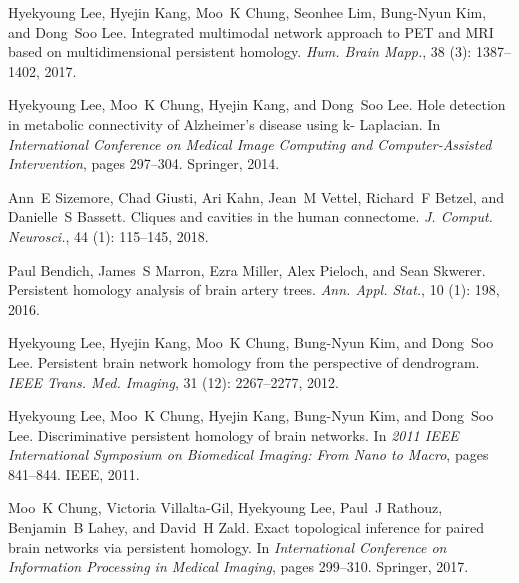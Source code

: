 Hyekyoung Lee, Hyejin Kang, Moo~K Chung, Seonhee Lim, Bung-Nyun Kim, and
Dong~Soo Lee.
\newblock Integrated multimodal network approach to {{PET}} and {{MRI}} based
on multidimensional persistent homology.
\newblock \emph{Hum. Brain Mapp.}, 38 (3): 1387--1402, 2017.

Hyekyoung Lee, Moo~K Chung, Hyejin Kang, and Dong~Soo Lee.
\newblock Hole detection in metabolic connectivity of {{Alzheimer}}'s disease
using k- {{Laplacian}}.
\newblock In \emph{International Conference on Medical Image Computing and
    Computer-Assisted Intervention}, pages 297--304. {Springer}, 2014.

Ann~E Sizemore, Chad Giusti, Ari Kahn, Jean~M Vettel, Richard~F Betzel, and
Danielle~S Bassett.
\newblock Cliques and cavities in the human connectome.
\newblock \emph{J. Comput. Neurosci.}, 44 (1): 115--145,
2018{}.

Paul Bendich, James~S Marron, Ezra Miller, Alex Pieloch, and Sean Skwerer.
\newblock Persistent homology analysis of brain artery trees.
\newblock \emph{Ann. Appl. Stat.}, 10 (1): 198, 2016.

Hyekyoung Lee, Hyejin Kang, Moo~K Chung, Bung-Nyun Kim, and Dong~Soo Lee.
\newblock Persistent brain network homology from the perspective of dendrogram.
\newblock \emph{IEEE Trans. Med. Imaging}, 31 (12):
2267--2277, 2012.

Hyekyoung Lee, Moo~K Chung, Hyejin Kang, Bung-Nyun Kim, and Dong~Soo Lee.
\newblock Discriminative persistent homology of brain networks.
\newblock In \emph{2011 {{IEEE}} International Symposium on Biomedical Imaging:
    {{From}} Nano to Macro}, pages 841--844. {IEEE}, 2011.

Moo~K Chung, Victoria {Villalta-Gil}, Hyekyoung Lee, Paul~J Rathouz, Benjamin~B
Lahey, and David~H Zald.
\newblock Exact topological inference for paired brain networks via persistent
homology.
\newblock In \emph{International Conference on Information Processing in
    Medical Imaging}, pages 299--310. {Springer}, 2017.

